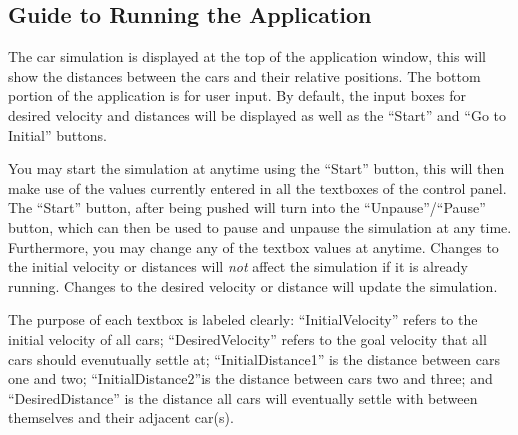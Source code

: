 \documentclass[12pt,letterpaper,oneside]{report}
\begin{document}
\subsection{Guide to Running the Application}
The car simulation is displayed at the top of the application window, 
this will show the distances between the cars and 
their relative positions. The bottom portion of the
application is for user input. By default, the input boxes for desired
velocity and distances will be displayed as well as the ``Start'' and
``Go to Initial'' buttons.

You may start the simulation at anytime using the ``Start'' button, this will
then make use of the values currently entered in all the textboxes of the
control panel. The ``Start'' button, after being pushed will turn into the 
``Unpause''/``Pause'' button, which can then be used to pause and unpause the
simulation at any time. Furthermore, you may change any of the textbox values
at anytime. Changes to the initial velocity or distances will \textit{not} 
affect the simulation if it is already running. Changes to the desired velocity
or distance will update the simulation.

The purpose of each textbox is labeled clearly: ``InitialVelocity'' refers to
the initial velocity of all cars; ``DesiredVelocity'' refers to the goal velocity
that all cars should evenutually settle at; ``InitialDistance1'' is the distance between
cars one and two; ``InitialDistance2''is the distance between cars two and three; and
``DesiredDistance'' is the distance all cars will eventually settle with between themselves
and their adjacent car(s).


\end{document}
